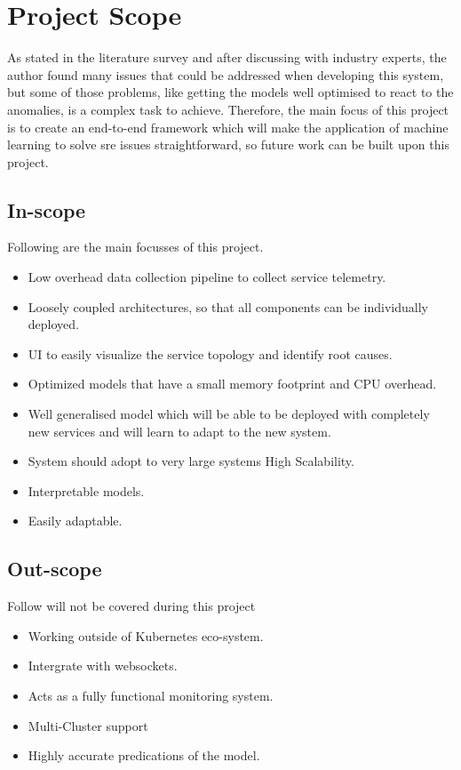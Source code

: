 \section{Project Scope}

As stated in the literature survey and after discussing with industry experts, the author found many issues that could be addressed when developing this system, but some of those problems, like getting the models well optimised to react to the anomalies, is a complex task to achieve. 
Therefore, the main focus of this project is to create an end-to-end framework which will make the application of machine learning to solve \ac{sre} issues straightforward, so future work can be built upon this project.

\subsection{In-scope} \label{sec:in-scope}
Following are the main focusses of this project.
\begin{itemize}[noitemsep,nolistsep] 
    \item Low overhead data collection pipeline to collect service telemetry.
    \item Loosely coupled architectures, so that all components can be individually deployed.
    \item UI to easily visualize the service topology and identify root causes.
    \item Optimized models that have a small memory footprint and CPU overhead.
    \item Well generalised model which will be able to be deployed with completely new services and will learn to adapt to the new system.
    \item System should adopt to very large systems High Scalability.
    \item Interpretable models.
    \item Easily adaptable.
\end{itemize}


\subsection{Out-scope} \label{sec:out-scope}
Follow will not be covered during this project
\begin{itemize}[noitemsep,nolistsep]
    \item Working outside of Kubernetes eco-system.
    \item Intergrate with websockets.
    \item Acts as a fully functional monitoring system.
    \item Multi-Cluster support
    \item Highly accurate predications of the model.
\end{itemize}

